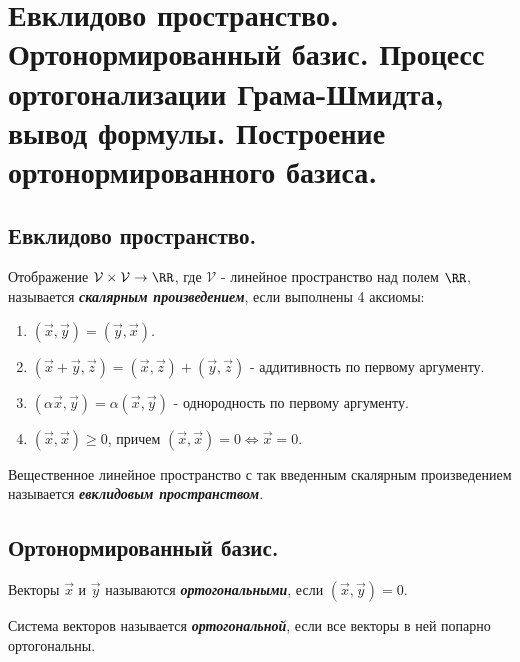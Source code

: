 \section{
    Евклидово пространство. Ортонормированный базис. Процесс ортогонализации Грама-Шмидта, вывод формулы. Построение ортонормированного базиса.
}

\subsection{
    Евклидово пространство.
}

\begin{definition}
    Отображение $\mathcal{V} \times \mathcal{V} \to \RR$, где $\mathcal{V}$ - линейное пространство над полем $\RR$, называется \textbf{\textit{скалярным произведением}}, если выполнены 4 аксиомы:
    \begin{enumerate}[nosep]
        \item $(\vec{x}, \vec{y}) = (\vec{y}, \vec{x})$.
        \item $(\vec{x} + \vec{y}, \vec{z}) = (\vec{x}, \vec{z}) + (\vec{y}, \vec{z})$ - аддитивность по первому аргументу.
        \item $(\alpha \vec{x}, \vec{y}) = \alpha(\vec{x}, \vec{y})$ - однородность по первому аргументу.
        \item $(\vec{x}, \vec{x}) \geq 0$, причем $(\vec{x}, \vec{x}) = 0 \iff \vec{x} = 0$.
    \end{enumerate}
\end{definition}

\begin{definition}
    Вещественное линейное пространство с так введенным скалярным произведением называется \textbf{\textit{евклидовым пространством}}.
\end{definition}

\subsection{
    Ортонормированный базис.
}

\begin{definition}
    Векторы $\vec{x}$ и $\vec{y}$ называются \textbf{\textit{ортогональными}}, если $(\vec{x}, \vec{y}) = 0$.
\end{definition}

\begin{definition}
    Система векторов называется \textit{\textbf{ортогональной}}, если все векторы в ней попарно ортогональны.
\end{definition}

